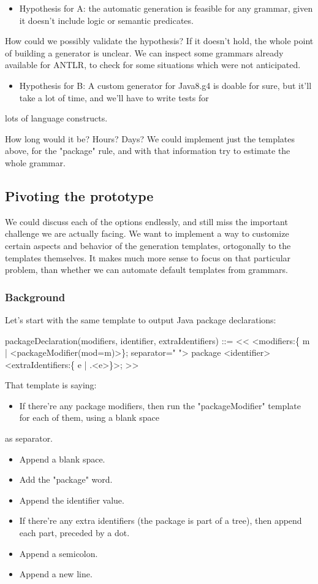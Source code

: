 \documentclass[11pt]{article}
\begin{document}
\begin{itemize}
\item Hypothesis for A: the automatic generation is feasible for any grammar, given it doesn't include logic or semantic predicates.
\end{itemize}

How could we possibly validate the hypothesis? If it doesn't hold, the whole point of building a generator is unclear. We can inspect
some grammars already available for ANTLR, to check for some situations which were not anticipated.

\begin{itemize}
\item Hypothesis for B: A custom generator for Java8.g4 is doable for sure, but it'll take a lot of time, and we'll have to write tests for
\end{itemize}
lots of language constructs.

How long would it be? Hours? Days? We could implement just the templates above, for the "package" rule, and with that information
try to estimate the whole grammar.

\subsection{Pivoting the prototype}
\label{sec-1-4}

We could discuss each of the options endlessly, and still miss the important challenge we are actually facing. We want to implement
a way to customize certain aspects and behavior of the generation templates, ortogonally to the templates themselves. It makes
much more sense to focus on that particular problem, than whether we can automate default templates from grammars.

\subsubsection{Background}
\label{sec-1-4-1}

Let's start with the same template to output Java package declarations:

packageDeclaration(modifiers, identifier, extraIdentifiers) ::= <<
<modifiers:\{ m | <packageModifier(mod=m)>\}; separator=" "> package <identifier><extraIdentifiers:\{ e | .<e>\}>;
>>

That template is saying:
\begin{itemize}
\item If there're any package modifiers, then run the "packageModifier" template for each of them, using a blank space
\end{itemize}
as separator.
\begin{itemize}
\item Append a blank space.
\item Add the "package" word.
\item Append the identifier value.
\item If there're any extra identifiers (the package is part of a tree), then append each part, preceded by a dot.
\item Append a semicolon.
\item Append a new line.
\end{itemize}
\end{document}
